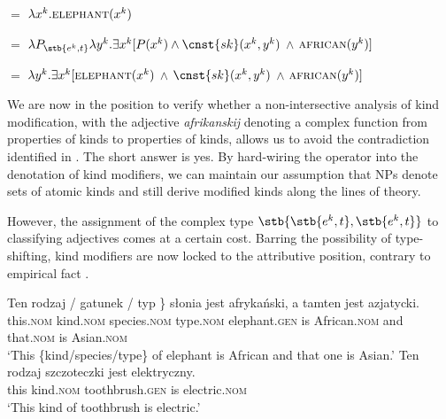 \documentclass[output=paper]{langscibook}
\begin{document}
\ea \label{ex:final_deriv}
\ea {} $=$ $\lambda x^k.\textsc{elephant}(x^k)$ \label{ex:final_deriv_1}

\ex {} $=$ $\lambda P_{\stb{e^k, t}}\lambda y^k. \exists x^k [P(x^k) \wedge \cnst{sk}(x^k, y^k)$ $\wedge$ $\textsc{african}(y^k)]$ \label{ex:final_deriv_2}

\ex {} $=$ $\lambda y^k. \exists x^k [\textsc{elephant}(x^k)$ $\wedge$ $\cnst{sk}(x^k, y^k)$ $\wedge$ $ \textsc{african}(y^k)]$
\label{ex:final_deriv_3}
\z \z

\noindent
We are now in the position to verify whether a non-intersective analysis of kind modification, with the adjective \textit{afrikanskij} denoting a complex function from properties of kinds to properties of kinds, allows us to avoid the contradiction identified in . The short answer is yes. By hard-wiring the  operator into the denotation of kind modifiers, we can maintain our assumption that NPs denote sets of atomic kinds and still derive modified kinds along the lines of  theory.
\largerpage %

\sloppy However, the assignment of the complex type $\stb{\stb{e^k,t}, \stb{e^k,t}}$ to classifying adjectives comes at a certain cost.
Barring the possibility of type-shifting, kind modifiers are now locked to the attributive position, contrary to empirical fact .

\ea \label{ex:predicative_modifier}
\ea \gll
Ten \minsp{\{} rodzaj / gatunek / typ \} słonia jest afrykański, a tamten jest azjatycki.\\
this.\textsc{nom} {} kind.\textsc{nom} { } species.\textsc{nom} { } type.\textsc{nom} { } elephant.\textsc{gen} is African.\textsc{nom} and that.\textsc{nom} is Asian.\textsc{nom}\\
\glt `This \{kind/species/type\} of elephant is African and that one is Asian.'
\ex \gll
Ten rodzaj szczoteczki jest elektryczny.\\
this kind.\textsc{nom} toothbrush.\textsc{gen} is electric.\textsc{nom}\\
\glt `This kind of toothbrush is electric.'
\z \z
\end{document}
